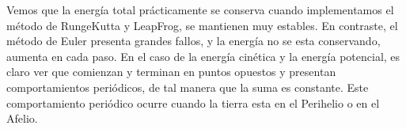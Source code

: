 \documentclass{article}
\begin{document}
Vemos que la energ\'ia total pr\'acticamente se conserva cuando implementamos el m\'etodo de RungeKutta y LeapFrog, se mantienen muy estables. En contraste, el m\'etodo de Euler presenta grandes fallos, y la energ\'ia no se esta conservando, aumenta en cada paso. En el caso de la energ\'ia cin\'etica y la energ\'ia potencial, es claro ver que comienzan y terminan en puntos opuestos y presentan comportamientos peri\'odicos, de tal manera que la suma es constante. Este comportamiento peri\'odico ocurre cuando la tierra esta en el Perihelio o en el Afelio.
\end{document}
